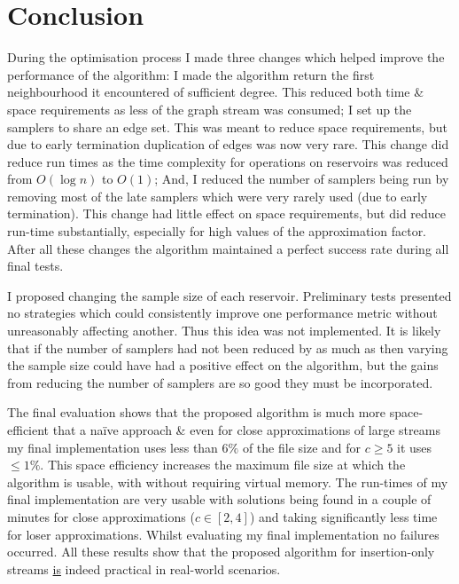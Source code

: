 \documentclass[11pt,twoside,a4paper]{report}
\begin{document}
\section{Conclusion}

\par During the optimisation process I made three changes which helped improve the performance of the algorithm: I made the algorithm return the first neighbourhood it encountered of sufficient degree. This reduced both time \& space requirements as less of the graph stream was consumed; I set up the samplers to share an edge set. This was meant to reduce space requirements, but due to early termination duplication of edges was now very rare. This change did reduce run times as the time complexity for operations on reservoirs was reduced from $O(\log n)$ to $O(1)$; And, I reduced the number of samplers being run by removing most of the late samplers which were very rarely used (due to early termination). This change had little effect on space requirements, but did reduce run-time substantially, especially for high values of the approximation factor. After all these changes the algorithm maintained a perfect success rate during all final tests.

\par I proposed changing the sample size of each reservoir. Preliminary tests presented no strategies which could consistently improve one performance metric without unreasonably affecting another. Thus this idea was not implemented. It is likely that if the number of samplers had not been reduced by as much as then varying the sample size could have had a positive effect on the algorithm, but the gains from reducing the number of samplers are so good they must be incorporated.

\par The final evaluation shows that the proposed algorithm is much more space-efficient that a naïve approach \& even for close approximations of large streams my final implementation uses less than $6\%$ of the file size and for $c\geq5$ it uses $\leq1\%$. This space efficiency increases the maximum file size at which the algorithm is usable, with without requiring virtual memory. The run-times of my final implementation are very usable with solutions being found in a couple of minutes for close approximations ($c\in[2,4]$) and taking significantly less time for loser approximations. Whilst evaluating my final implementation no failures occurred. All these results show that the proposed algorithm for insertion-only streams \underline{is} indeed practical in real-world scenarios.
\end{document}
